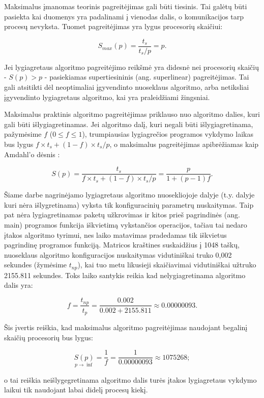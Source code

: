 \documentclass{VUMIFPSbakalaurinis}
\begin{document}
Maksimalus įmanomas teorinis pagreitėjimas gali būti tiesinis. 
Tai galėtų būti pasiekta kai duomenys yra padalinami į vienodas dalis, o komunikacijos tarp procesų nevyksta.
Tuomet pagreitėjimas yra lygus procesorių skaičiui:

\[ S_{max}(p) = \frac{t_s}{t_s/p} = p .\]

Jei lygiagretaus algoritmo pagreitėjimo reikšmė yra didesnė nei procesorių skaičių - $S(p) > p$ - pasiekiamas supertiesininis (ang. superlinear) pagreitėjimas. 
Tai gali atsitikti dėl neoptimaliai įgyvendinto nuoseklaus algoritmo, arba netiksliai įgyvendinto lygiagretaus algoritmo, kai yra praleidžiami žingsniai.

Maksimalus praktinis algoritmo pagreitėjimas priklauso nuo algoritmo dalies, kuri gali būti išlygiagretinamas. 
Jei algoritmo dalį, kuri negali būti išlygiagretinama, pažymėsime $f$ ($0 \le f \le 1$), trumpiausias lygiagrečios programos vykdymo laikas bus lygus $f \times t_s+ (1-f) \times t_s/p$, o maksimalus pagreitėjimas apibrėžiamas kaip Amdahl'o dėsnis \cite{amdahl1967validity}:



\[ S(p) = \frac{t_s}{f \times t_s+ (1-f) \times t_s/p} = \frac{p}{1+(p-1)f} .\]


Šiame darbe nagrinėjamo lygiagretaus algoritmo nuosekliojoje dalyje (t.y. dalyje kuri nėra išlygretinama) vyksta tik konfiguracinių parametrų nuskaitymas. 
Taip pat nėra lygiagretinamas paketų užkrovimas ir kitos prieš pagrindinės (ang. main) programos funkcija iškvietimą vykstančios operacijos, tačiau tai nedaro įtakos algoritmo tyrimui, nes laiko matavimas pradedamas tik iškvietus pagrindinę programos funkciją.
Matricos kraštines suskaidžius į 1048 taškų, nuoseklaus algoritmo konfiguracijos nuskaitymas vidutiniškai truko 0,002 sekundes (žymėsime $t_{np}$), kai tuo metu likusieji skaičiavimai vidutiniškai užtruko 2155.811 sekundes.
Toks laiko santykis reikia kad nelygiagretinama algoritmo dalis yra:

\[ f = \frac{t_{np}}{t_p} = \frac{0.002}{0.002+2155.811} \approx 0.00000093 .\]

Šis įvertis reiškia, kad maksimalus algoritmo pagreitėjimas naudojant begalinį skaičių procesorių bus lygus:

\[ \underset{p \rightarrow \inf}{S(p)} = \frac{1}{f} = \frac{1}{0.00000093} \approx 1075268  ;\]

o tai reiškia neišlygegretinama algoritmo dalis turės įtakos lygiagretaus vykdymo laikui tik naudojant labai didelį procesų kiekį.
\end{document}
